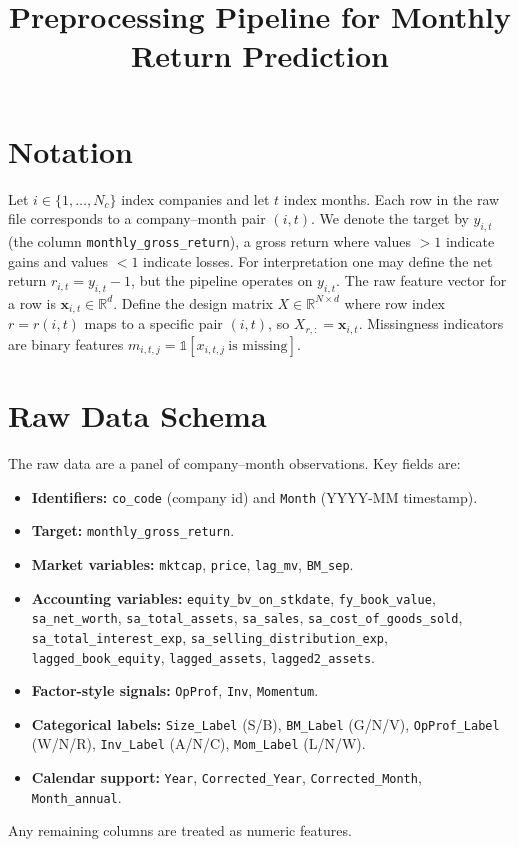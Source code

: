 \documentclass[11pt]{article}
\title{Preprocessing Pipeline for Monthly Return Prediction}
\date{}
\begin{document}
\maketitle

\section{Notation}

Let $i \in \{1,\dots,N_c\}$ index companies and let $t$ index months. Each row in the
raw file corresponds to a company--month pair $(i,t)$. We denote the target by
$y_{i,t}$ (the column \texttt{monthly\_gross\_return}), a gross return where values
$> 1$ indicate gains and values $< 1$ indicate losses. For interpretation one may
define the net return $r_{i,t} = y_{i,t} - 1$, but the pipeline operates on $y_{i,t}$.
The raw feature vector for a row is $\mathbf{x}_{i,t} \in \mathbb{R}^d$. Define the
design matrix $X \in \mathbb{R}^{N \times d}$ where row index $r = r(i,t)$ maps to a
specific pair $(i,t)$, so $X_{r,:} = \mathbf{x}_{i,t}$. Missingness indicators are
binary features $m_{i,t,j} = \mathbb{1}[x_{i,t,j}\ \text{is missing}]$.

\section{Raw Data Schema}

The raw data are a panel of company--month observations. Key fields are:
\begin{itemize}
	\item \textbf{Identifiers:} \texttt{co\_code} (company id) and \texttt{Month}
	(YYYY-MM timestamp).
	\item \textbf{Target:} \texttt{monthly\_gross\_return}.
	\item \textbf{Market variables:} \texttt{mktcap}, \texttt{price},
	\texttt{lag\_mv}, \texttt{BM\_sep}.
	\item \textbf{Accounting variables:} \texttt{equity\_bv\_on\_stkdate},
	\texttt{fy\_book\_value}, \texttt{sa\_net\_worth}, \texttt{sa\_total\_assets},
	\texttt{sa\_sales}, \texttt{sa\_cost\_of\_goods\_sold},
	\texttt{sa\_total\_interest\_exp}, \texttt{sa\_selling\_distribution\_exp},
	\texttt{lagged\_book\_equity}, \texttt{lagged\_assets}, \texttt{lagged2\_assets}.
	\item \textbf{Factor-style signals:} \texttt{OpProf}, \texttt{Inv},
	\texttt{Momentum}.
	\item \textbf{Categorical labels:} \texttt{Size\_Label} (S/B), \texttt{BM\_Label}
	(G/N/V), \texttt{OpProf\_Label} (W/N/R), \texttt{Inv\_Label} (A/N/C),
	\texttt{Mom\_Label} (L/N/W).
	\item \textbf{Calendar support:} \texttt{Year}, \texttt{Corrected\_Year},
	\texttt{Corrected\_Month}, \texttt{Month\_annual}.
\end{itemize}
Any remaining columns are treated as numeric features.
\end{document}
